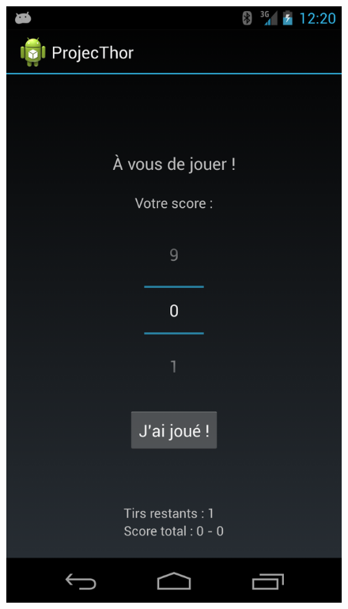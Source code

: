 \begin{figure}
\begin{minipage}{0.45\textwidth}
		\includegraphics[scale=0.2]{view_3.png}
	\end{minipage}

\end{figure}


